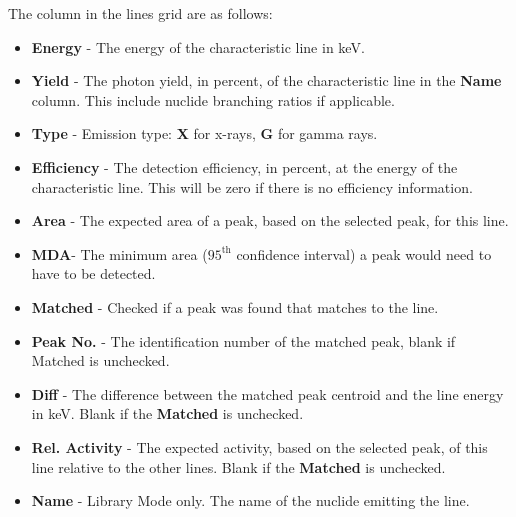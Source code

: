 \documentclass[12pt,report,justified]{SANDreport}
\begin{document}
The column in the lines grid are as follows:
\begin{itemize}
    \item \textbf{Energy} - The energy of the characteristic line in keV.
    \item \textbf{Yield} - The photon yield, in percent, of the characteristic line in the \textbf{Name} column. This include nuclide branching ratios if applicable.
    \item \textbf{Type} - Emission type: \textbf{X} for x-rays, \textbf{G} for gamma rays.
    \item \textbf{Efficiency} - The detection efficiency, in percent, at the energy of the characteristic line. This will be zero if there is no efficiency information.
    \item \textbf{Area} - The expected area of a peak, based on the selected peak, for this line. 
    \item \textbf{MDA}- The minimum area (\(95^{\text{th}}\) confidence interval) a peak would need to have to be detected.
    \item \textbf{Matched} - Checked if a peak was found that matches to the line.
    \item \textbf{Peak No.} - The identification number of the matched peak, blank if Matched is unchecked.
    \item \textbf{Diff} - The difference between the matched peak centroid and the line energy in keV. Blank if the \textbf{Matched} is unchecked.
    \item \textbf{Rel. Activity} - The expected activity, based on the selected peak, of this line relative to the other lines. Blank if the \textbf{Matched} is unchecked.
    \item \textbf{Name} - Library Mode only. The name of the nuclide emitting the line.
\end{itemize}
\end{document}
